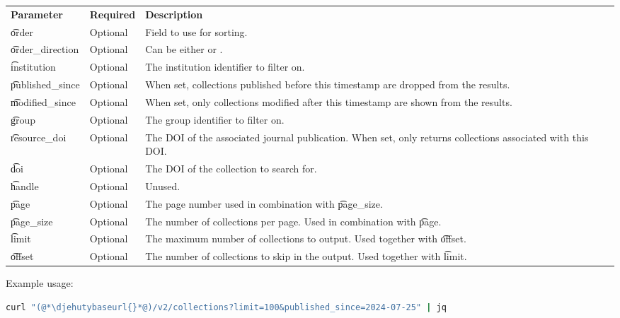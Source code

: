 \begin{tabularx}{\textwidth}{*{2}{!{\VRule[-1pt]}l}!{\VRule[-1pt]}X}
  \headrow
  \textbf{Parameter}   & \textbf{Required} & \textbf{Description}\\
  \t{order}            & Optional & Field to use for sorting.\\
  \t{order\_direction} & Optional & Can be either  or .\\
  \t{institution}      & Optional & The institution identifier to filter on.\\
  \t{published\_since} & Optional & When set, collections published before this
                                    timestamp are dropped from the results.\\
  \t{modified\_since}  & Optional & When set, only collections modified after
                                    this timestamp are shown from the results.\\
  \t{group}            & Optional & The group identifier to filter on.\\
  \t{resource\_doi}    & Optional & The DOI of the associated journal publication.
                                    When set, only returns collections associated
                                    with this DOI.\\
  \t{doi}              & Optional & The DOI of the collection to search for.\\
  \t{handle}           & Optional & Unused.\\
  \t{page}             & Optional & The page number used in combination with
                                    \t{page\_size}.\\
  \t{page\_size}       & Optional & The number of collections per page.  Used
                                    in combination with \t{page}.\\
  \t{limit}            & Optional & The maximum number of collections to output.
                                    Used together with \t{offset}.\\
  \t{offset}           & Optional & The number of collections to skip in the
                                    output.  Used together with \t{limit}.\\
\end{tabularx}

  Example usage:
\begin{lstlisting}[language=bash]
curl "(@*\djehutybaseurl{}*@)/v2/collections?limit=100&published_since=2024-07-25" | jq
\end{lstlisting}


